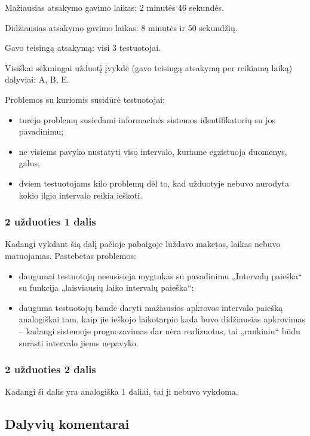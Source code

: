 Mažiausias atsakymo gavimo laikas: 2 minutės 46 sekundės.

Didžiausias atsakymo gavimo laikas: 8 minutės ir 50 sekundžių.

Gavo teisingą atsakymą: visi 3 testuotojai.

Visiškai sėkmingai užduotį įvykdė (gavo teisingą atsakymą per reikiamą 
laiką) dalyviai: A, B, E.

Problemos su kuriomis susidūrė testuotojai:
\begin{itemize}
  \item turėjo problemų susiedami informacinės sistemos identifikatorių
    su jos pavadinimu;
  \item ne visiems pavyko nustatyti viso intervalo, kuriame egzistuoja
    duomenys, galus;
  \item dviem testuotojams kilo problemų dėl to, kad užduotyje nebuvo
    nurodyta kokio ilgio intervalo reikia ieškoti.
\end{itemize}

\subsubsection{2 užduoties 1 dalis}

Kadangi vykdant šią dalį pačioje pabaigoje lūždavo maketas, laikas
nebuvo matuojamas. Pastebėtas problemos:
\begin{itemize}
  \item daugumai testuotojų nesusisieja mygtukas su pavadinimu „Intervalų
    paieška“ su funkcija „laisviausių laiko intervalų paieška“;
  \item dauguma testuotojų bandė daryti mažiausios apkrovos intervalo
    paiešką analogiškai tam, kaip jie ieškojo laikotarpio kada buvo
    didžiausias apkrovimas – kadangi sistemoje prognozavimas dar nėra
    realizuotas, tai „rankiniu“ būdu surasti intervalo jiems nepavyko.
\end{itemize}

\subsubsection{2 užduoties 2 dalis}

Kadangi ši dalis yra analogiška 1 daliai, tai ji nebuvo vykdoma.

\subsection{Dalyvių komentarai}

